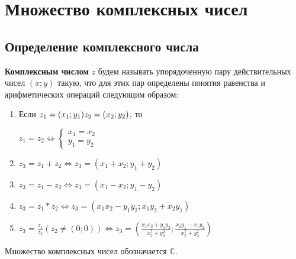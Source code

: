 \documentclass[a4paper,oneside]{article}
\newcommand{\parspace}{\vspace{10pt}}
\theoremstyle{definition}
\theoremstyle{definition}
\theoremstyle{definition}
\begin{document}
\section{Множество комплексных чисел}

\subsection{Определение комплексного числа}

\textbf{Комплексным числом} $z$ будем называть упорядоченную пару действительных
чисел $(x;y)$ такую, что для этих пар определены понятия равенства и арифметических
операций следующим образом:

\begin{enumerate}
    \item Если $\\ z_1 = (x_1;y_1) \\ z_2 = (x_2;y_2)$, то
    
    $z_1 = z_2 \Leftrightarrow \begin{cases}
        x_1 = x_2 \\
        y_1 = y_2
    \end{cases}$

    \item $z_3 = z_1 + z_2 \Leftrightarrow z_3 = (x_1 + x_2; y_1 + y_2)$
    \item $z_3 = z_1 - z_2 \Leftrightarrow z_3 = (x_1 - x_2; y_1 - y_2)$
    \item $z_3 = z_1 * z_2 \Leftrightarrow z_3 = (x_1 x_2 - y_1 y_2; x_1 y_2 + x_2 y_1)$
    \item $z_3 = \frac{z_1}{z_2} (z_2 \neq (0; 0)) \Leftrightarrow 
    z_3 = (\frac{x_1 x_2 + y_1 y_2}{x_2^2 + y_2^2}; \frac{x_2 y_1 - x_1 y_2}{x_2^2 + y_2^2})$
\end{enumerate}

Множество комплексных чисел обозначается $\mathbb{C}$.

\parspace
\end{document}
